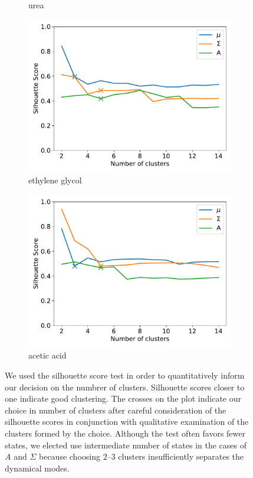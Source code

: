 \documentclass{article}
\begin{document}
\begin{figure}[h]
\begin{subfigure}{0.45\textwidth}
  \caption{urea}\label{fig:silhouette_URE}
  \end{subfigure}
  \begin{subfigure}{0.45\textwidth}
  \includegraphics[width=\textwidth]{silhouette_GCL.pdf}
  \caption{ethylene glycol}\label{fig:silhouette_GCL}
  \end{subfigure}
  \begin{subfigure}{0.45\textwidth}
  \includegraphics[width=\textwidth]{silhouette_ACH.pdf}
  \caption{acetic acid}\label{fig:silhouette_ACH}
  \end{subfigure}
  \caption{We used the silhouette score test in order to quantitatively
  inform our decision on the numbrer of clusters. Silhouette scores 
  closer to one indicate good clustering. The crosses on the plot indicate
  our choice in number of clusters after careful consideration of the
  silhouette scores in conjunction with qualitative examination of the clusters
  formed by the choice. Although the test often
  favors fewer states, we elected use intermediate number of states in 
  the cases of $A$ and $\Sigma$ because choosing 2--3 clusters 
  insufficiently separates the dynamical modes. }\label{fig:silhouette}
  \end{figure}
  
\end{document}
